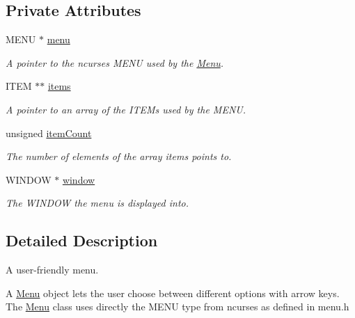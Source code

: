 \subsection*{Private Attributes}
\begin{DoxyCompactItemize}
\item 
\hypertarget{class_menu_aed75e71c827fde2522cde91e6ba9b18f}{M\-E\-N\-U $\ast$ \hyperlink{class_menu_aed75e71c827fde2522cde91e6ba9b18f}{menu}}\label{class_menu_aed75e71c827fde2522cde91e6ba9b18f}

\begin{DoxyCompactList}\small\item\em A pointer to the ncurses M\-E\-N\-U used by the \hyperlink{class_menu}{Menu}. \end{DoxyCompactList}\item 
\hypertarget{class_menu_ae9c2cb4729300a2156a2c67189b2c5f1}{I\-T\-E\-M $\ast$$\ast$ \hyperlink{class_menu_ae9c2cb4729300a2156a2c67189b2c5f1}{items}}\label{class_menu_ae9c2cb4729300a2156a2c67189b2c5f1}

\begin{DoxyCompactList}\small\item\em A pointer to an array of the I\-T\-E\-Ms used by the M\-E\-N\-U. \end{DoxyCompactList}\item 
unsigned \hyperlink{class_menu_a603550e4ba169a208b2ebd0d9946b1bd}{item\-Count}
\begin{DoxyCompactList}\small\item\em The number of elements of the array items points to. \end{DoxyCompactList}\item 
\hypertarget{class_menu_af9b1a69b58c1fb573305c3ee831c9e70}{W\-I\-N\-D\-O\-W $\ast$ \hyperlink{class_menu_af9b1a69b58c1fb573305c3ee831c9e70}{window}}\label{class_menu_af9b1a69b58c1fb573305c3ee831c9e70}

\begin{DoxyCompactList}\small\item\em The W\-I\-N\-D\-O\-W the menu is displayed into. \end{DoxyCompactList}\end{DoxyCompactItemize}


\subsection{Detailed Description}
A user-\/friendly menu. 

A \hyperlink{class_menu}{Menu} object lets the user choose between different options with arrow keys. The \hyperlink{class_menu}{Menu} class uses directly the M\-E\-N\-U type from ncurses as defined in menu.\-h 

